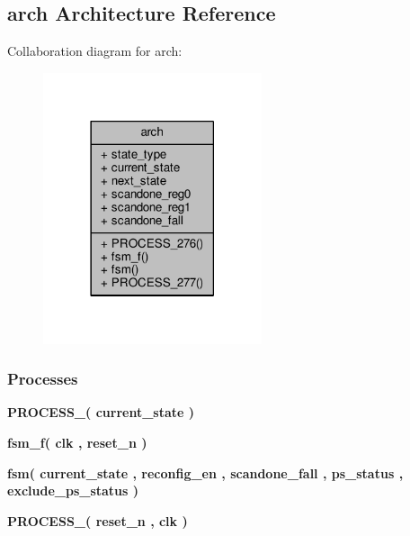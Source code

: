\subsection{arch Architecture Reference}
\label{classpll__reconfig__status_1_1arch}


Collaboration diagram for arch\+:\nopagebreak
\begin{figure}[H]
\begin{center}
\leavevmode
\includegraphics[width=182pt]{dd/d80/classpll__reconfig__status_1_1arch__coll__graph}
\end{center}
\end{figure}
\subsubsection*{Processes}
 \begin{DoxyCompactItemize}
\item 
{\bf P\+R\+O\+C\+E\+S\+S\+\_}{\bfseries  ( {\bfseries {\bfseries {\bf current\+\_\+state}} \textcolor{vhdlchar}{ }} )}
\item 
{\bf fsm\+\_\+f}{\bfseries  ( {\bfseries {\bfseries {\bf clk}} \textcolor{vhdlchar}{ }} , {\bfseries {\bfseries {\bf reset\+\_\+n}} \textcolor{vhdlchar}{ }} )}
\item 
{\bf fsm}{\bfseries  ( {\bfseries {\bfseries {\bf current\+\_\+state}} \textcolor{vhdlchar}{ }} , {\bfseries {\bfseries {\bf reconfig\+\_\+en}} \textcolor{vhdlchar}{ }} , {\bfseries {\bfseries {\bf scandone\+\_\+fall}} \textcolor{vhdlchar}{ }} , {\bfseries {\bfseries {\bf ps\+\_\+status}} \textcolor{vhdlchar}{ }} , {\bfseries {\bfseries {\bf exclude\+\_\+ps\+\_\+status}} \textcolor{vhdlchar}{ }} )}
\item 
{\bf P\+R\+O\+C\+E\+S\+S\+\_}{\bfseries  ( {\bfseries {\bfseries {\bf reset\+\_\+n}} \textcolor{vhdlchar}{ }} , {\bfseries {\bfseries {\bf clk}} \textcolor{vhdlchar}{ }} )}
\end{DoxyCompactItemize}
